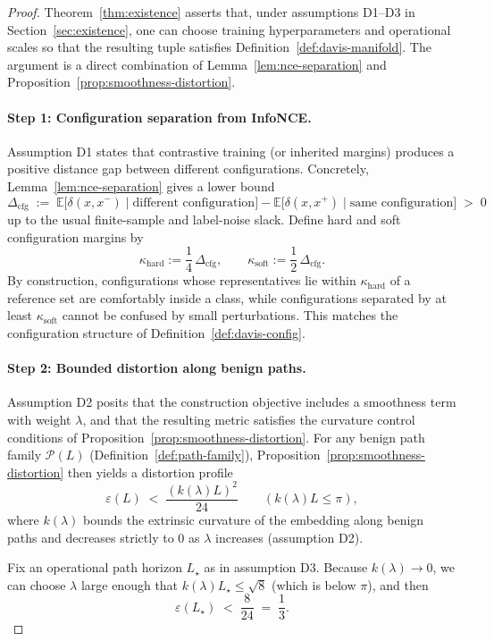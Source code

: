 \documentclass[11pt]{article}
\theoremstyle{remark}
\theoremstyle{plain}
\begin{document}
\begin{proof}
Theorem~\ref{thm:existence} asserts that, under assumptions D1–D3 in Section~\ref{sec:existence},
one can choose training hyperparameters and operational scales so that the resulting tuple satisfies
Definition~\ref{def:davis-manifold}.  The argument is a direct combination of
Lemma~\ref{lem:nce-separation} and Proposition~\ref{prop:smoothness-distortion}.

\paragraph{Step 1: Configuration separation from InfoNCE.}
Assumption D1 states that contrastive training (or inherited margins) produces a positive
distance gap between different configurations.  Concretely, Lemma~\ref{lem:nce-separation}
gives a lower bound
\[
\Delta_{\mathrm{cfg}}
\;:=\;
\mathbb{E}\bigl[\delta(x,x^{-})\mid \text{different configuration}\bigr]
-
\mathbb{E}\bigl[\delta(x,x^{+})\mid \text{same configuration}\bigr]
\;>\; 0
\]
up to the usual finite-sample and label-noise slack.  Define hard and soft configuration margins by
\[
\kappa_{\mathrm{hard}} := \frac{1}{4}\,\Delta_{\mathrm{cfg}},
\qquad
\kappa_{\mathrm{soft}} := \frac{1}{2}\,\Delta_{\mathrm{cfg}}.
\]
By construction, configurations whose representatives lie within $\kappa_{\mathrm{hard}}$ of a reference
set are comfortably inside a class, while configurations separated by at least $\kappa_{\mathrm{soft}}$
cannot be confused by small perturbations.  This matches the configuration structure of
Definition~\ref{def:davis-config}.

\paragraph{Step 2: Bounded distortion along benign paths.}
Assumption D2 posits that the construction objective includes a smoothness term with weight
$\lambda$, and that the resulting metric satisfies the curvature control conditions of
Proposition~\ref{prop:smoothness-distortion}.  For any benign path family $\mathcal{P}(L)$
(Definition~\ref{def:path-family}), Proposition~\ref{prop:smoothness-distortion} then yields a
distortion profile
\[
\varepsilon(L) \;<\; \frac{(k(\lambda) L)^2}{24} \qquad (k(\lambda)L \le \pi),
\]
where $k(\lambda)$ bounds the extrinsic curvature of the embedding along benign paths and decreases
strictly to $0$ as $\lambda$ increases (assumption D2).

Fix an operational path horizon $L_\star$ as in assumption D3.  Because $k(\lambda)\to 0$, we can choose
$\lambda$ large enough that $k(\lambda) L_\star \le \sqrt{8}$ (which is below $\pi$), and then
\[
\varepsilon(L_\star) \;<\; \frac{8}{24} \;=\; \frac{1}{3}.
\]


\end{proof}
\end{document}
